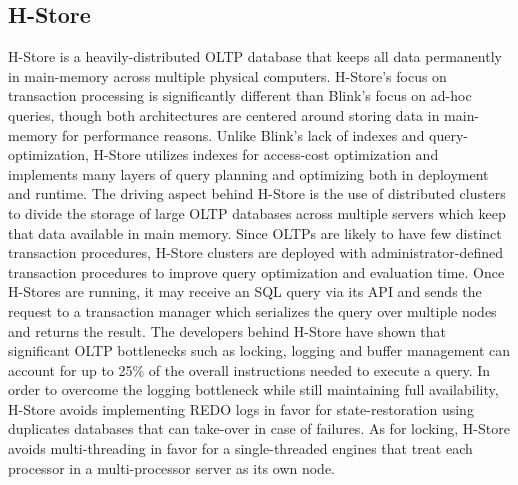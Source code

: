 \documentclass[11pt,a4paper]{report}
\begin{document}
\subsection{H-Store}
H-Store is a heavily-distributed OLTP database that keeps all data permanently in main-memory across multiple physical computers. \cite{kallman2008h} H-Store's focus on transaction processing is significantly different than Blink's focus on ad-hoc queries, though both architectures are centered around storing data in main-memory for performance reasons. Unlike Blink's lack of indexes and query-optimization, H-Store utilizes indexes for access-cost optimization and implements many layers of query planning and optimizing both in deployment and runtime. \cite{kallman2008h} The driving aspect behind H-Store is the use of distributed clusters to divide the storage of large OLTP databases across multiple servers which keep that data available in main memory. \cite{kallman2008h, harizopoulos2008oltp} Since OLTPs are likely to have few distinct transaction procedures, H-Store clusters are deployed with administrator-defined transaction procedures to improve query optimization and evaluation time. \cite{kallman2008h} Once H-Stores are running, it may receive an SQL query via its API and sends the request to a transaction manager which serializes the query over multiple nodes and returns the result.\cite{kallman2008h} The developers behind H-Store have shown that significant OLTP bottlenecks such as locking, logging and buffer management can account for up to 25\% of the overall instructions needed to execute a query. \cite{harizopoulos2008oltp} In order to overcome the logging bottleneck while still maintaining full availability, H-Store avoids implementing REDO logs in favor for state-restoration using duplicates databases that can take-over in case of failures.\cite{harizopoulos2008oltp} As for locking, H-Store avoids multi-threading in favor for a single-threaded engines that treat each processor in a multi-processor server as its own node.\cite{kallman2008h} 
\end{document}
